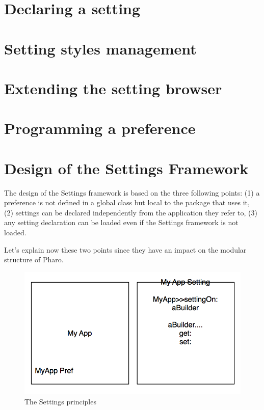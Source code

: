 \documentclass[a4paper,10pt,twoside]{book}
\begin{document}
\section{Declaring a setting}
\label{sec:DeclaringASetting}



\section{Setting styles management}
\label{sec:SettingStylesManagement}

\section{Extending the setting browser}
\label{sec:ExtendingTheSettingBrowser}

\section{Programming a preference}
\label{sec:ProgrammingAPreference}

\section{Design of the Settings Framework}
The design of the Settings framework is based on the three following points: (1) a preference is not defined in a global class but local to the package that uses it, (2) settings can be declared independently from the application they refer to, (3) any setting declaration can be loaded even if the Settings framework is not loaded. 

Let's explain now these two points since they have an impact on the modular structure of Pharo. 

\begin{figure}[tbh]
\begin{center}
\includegraphics[scale=0.3]{Principles}
\caption{The Settings principles}
\end{center}
\end{figure}
\end{document}

